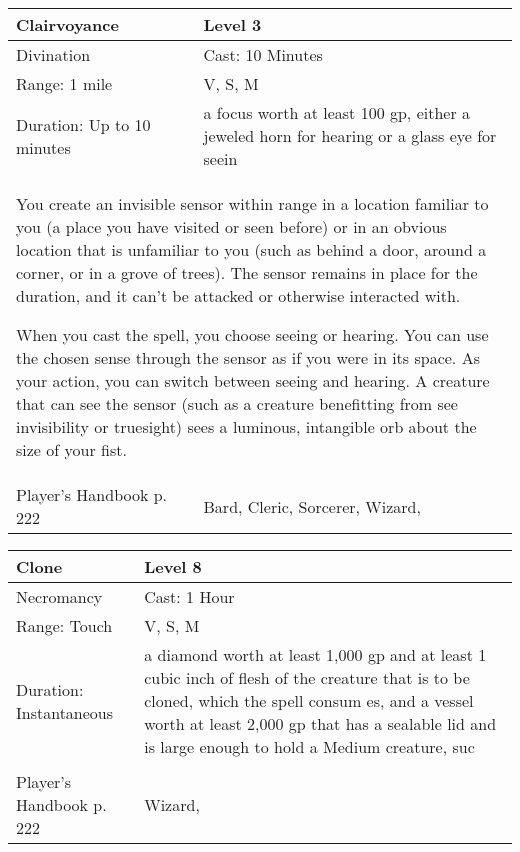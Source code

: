 \documentclass[11pt]{report}
\begin{document}
\begin{table}[H]
	\begin{tabular}{||p{6cm}|p{6cm}||}
		\hline\hline
		\bf{Clairvoyance} & Level 3\\ \hline
		Divination & Cast: 10 Minutes\\ \hline
		Range: 1 mile & V, S, M \\ \hline
		Duration: Up to 10 minutes & a focus worth at least 100 gp, either a jeweled horn for hearing or a glass eye for seein\\ \hline
		\multicolumn{2}{||p{12cm}||}{You create an invisible sensor within range in a location familiar to you (a place you have visited or seen before) or in an obvious location that is unfamiliar to you (such as behind a door, around a corner, or in a grove of trees). The sensor remains in place for the duration, and it can’t be attacked or otherwise interacted with. 

When you cast the spell, you choose seeing or hearing. You can use the chosen sense through the sensor as if you were in its space. As your action, you can switch between seeing and hearing. A creature that can see the sensor (such as a creature benefitting from see invisibility or truesight) sees a luminous, intangible orb about the size of your fist.}\\ \hline
Player's Handbook p. 222 & Bard, Cleric, Sorcerer, Wizard, \\ \hline\hline
	\end{tabular}
\end{table}

\begin{table}[H]
	\begin{tabular}{||p{6cm}|p{6cm}||}
		\hline\hline
		\bf{Clone} & Level 8\\ \hline
		Necromancy & Cast: 1 Hour\\ \hline
		Range: Touch & V, S, M\\ \hline
		Duration: Instantaneous & a diamond worth at least 1,000 gp and at least 1 cubic inch of flesh of the creature that is to be cloned, which the spell consum es, and a vessel worth at least 2,000 gp that has a sealable lid and is large enough to hold a Medium creature, suc\\ \hline
		\multicolumn{2}{||p{12cm}||}{}\\ \hline
Player's Handbook p. 222 & Wizard, \\ \hline\hline
	\end{tabular}
\end{table}
\end{document}
